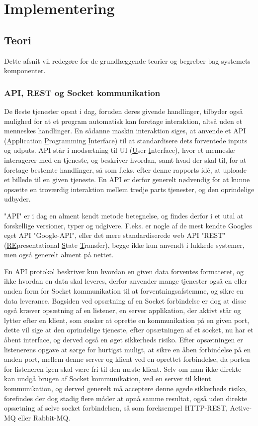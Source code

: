 \section{Implementering}

\subsection{Teori}
Dette afsnit vil redegøre for de grundlæggende teorier og begreber bag systemets komponenter.

\subsubsection{API, REST og Socket kommunikation}
De fleste tjenester opsat i dag, foruden deres givende handlinger, tilbyder også mulighed for at et program automatisk kan foretage interaktion, altså uden et menneskes handlinger. En sådanne maskin interaktion siges, at anvende et API (\underline{A}pplication \underline{P}rogramming \underline{I}nterface) til at standardisere dets forventede inputs og udputs. 
API står i modsætning til UI (\underline{U}ser \underline{I}nterface), hvor et menneske interagerer med en tjeneste, og beskriver hvordan, samt hvad der skal til, for at foretage bestemte handlinger, så som f.eks. efter denne rapports idé, at uploade et billede til en given tjeneste. En API er derfor generelt nødvendig for at kunne opsætte en troværdig interaktion mellem tredje parts tjenester, og den oprindelige udbyder. \cite{WhatIsAPI}

"API" er i dag en alment kendt metode betegnelse, og findes derfor i et utal at forskellige versioner, typer og udgivere. F.eks. er nogle af de mest kendte Googles eget API "Google-API", eller det mere standardiserede web API "REST" (\underline{RE}presentational \underline{S}tate \underline{T}ransfer), begge ikke kun anvendt i lukkede systemer, men også generelt alment på nettet. \cite{codecademy_REST}

En API protokol beskriver kun hvordan en given data forventes formateret, og ikke hvordan en data skal leveres, derfor anvender mange tjenester også en eller anden form for Socket kommunikation til at forventningsafstemme, og sikre en data leverance. Bagsiden ved opsætning af en Socket forbindelse er dog at disse også kræver opsætning af en listener, en server applikation, der aktivt står og lytter efter en klient, som ønsker at oprette en kommunikation på en given port, dette vil sige at den oprindelige tjeneste, efter opsætningen af et socket, nu har et åbent interface, og derved også en øget sikkerheds risiko. Efter opsætningen er listenerens opgave at sørge for hurtigst muligt, at sikre en åben forbindelse på en anden port, mellem denne server og klient ved en oprettet forbindelse, da porten for listeneren igen skal være fri til den næste klient. \cite{WhatIsSocket} Selv om man ikke direkte kan undgå brugen af Socket kommunikation, ved en server til klient kommunikation, og derved generelt må acceptere denne øgede sikkerheds risiko, forefindes der dog stadig flere måder at opnå samme resultat, også uden direkte opsætning af selve socket forbindelsen, så som foreksempel HTTP-REST, Active-MQ eller Rabbit-MQ. \cite{SocketAlternatives}